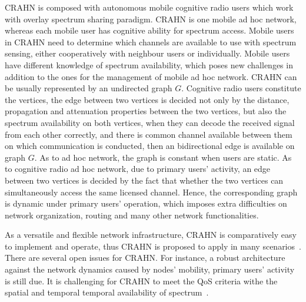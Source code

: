 CRAHN is composed with autonomous mobile cognitive radio users which work with overlay spectrum sharing paradigm.
CRAHN is one mobile ad hoc network, whereas each mobile user has cognitive ability for spectrum access.
Mobile users in CRAHN need to determine which channels are available to use with spectrum sensing, either cooperatively with neighbour users or individually.
Mobile users have different knowledge of spectrum availability, which poses new challenges in addition to the ones for the management of mobile ad hoc network.
CRAHN can be usually represented by an undirected graph $G$.
Cognitive radio users constitute the vertices, the edge between two vertices is decided not only by the distance, propagation and attenuation properties between the two vertices, but also the spectrum availability on both vertices, \ie when they can decode the received signal from each other correctly, and there is common channel available between them on which communication is conducted, then an bidirectional edge is available on graph $G$.
As to ad hoc network, the graph is constant when users are static.
As to cognitive radio ad hoc network, due to primary users' activity, an edge between two vertices is decided by the fact that whether the two vertices can simultaneously access the same licensed channel.
Hence, the corresponding graph is dynamic under primary users' operation, which imposes extra difficulties on network organization, routing and many other network functionalities.

As a versatile and flexible network infrastructure, CRAHN is comparatively easy to implement and operate, thus CRAHN is proposed to apply in many scenarios~\cite{Akyildiz09}.
There are several open issues for CRAHN.
For instance, a robust architecture against the network dynamics caused by nodes' mobility, primary users' activity is still due.
It is challenging for CRAHN to meet the QoS criteria withe the spatial and temporal temporal availability of spectrum~\cite{Mansoor2014}.




